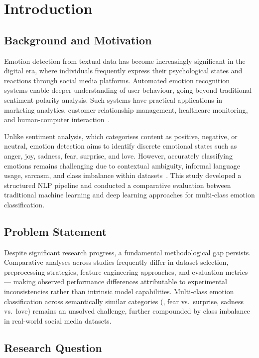\section{Introduction}
\label{sec:introduction}

\subsection{Background and Motivation}

Emotion detection from textual data has become increasingly significant in the digital era, where individuals frequently express their psychological states and reactions through social media platforms. Automated emotion recognition systems enable deeper understanding of user behaviour, going beyond traditional sentiment polarity analysis. Such systems have practical applications in marketing analytics, customer relationship management, healthcare monitoring, and human-computer interaction~\citep{nandwani2021review, poria2019deeper}.

Unlike sentiment analysis, which categorises content as positive, negative, or neutral, emotion detection aims to identify discrete emotional states such as anger, joy, sadness, fear, surprise, and love. However, accurately classifying emotions remains challenging due to contextual ambiguity, informal language usage, sarcasm, and class imbalance within datasets~\citep{seyeditabari2018emotion}. This study developed a structured NLP pipeline and conducted a comparative evaluation between traditional machine learning and deep learning approaches for multi-class emotion classification.

\subsection{Problem Statement}

Despite significant research progress, a fundamental methodological gap persists. Comparative analyses across studies frequently differ in dataset selection, preprocessing strategies, feature engineering approaches, and evaluation metrics --- making observed performance differences attributable to experimental inconsistencies rather than intrinsic model capabilities. Multi-class emotion classification across semantically similar categories (\eg, fear vs.\ surprise, sadness vs.\ love) remains an unsolved challenge, further compounded by class imbalance in real-world social media datasets.

\subsection{Research Question}

